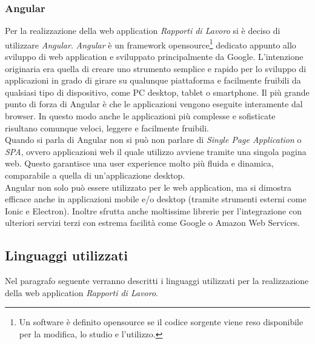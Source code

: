   \subsubsection{Angular}
  Per la realizzazione della web application \textit{Rapporti di Lavoro} si è deciso di utilizzare 
  \textit{Angular}. \textit{Angular} è un framework opensource\footnote{Un software è definito opensource 
  se il codice sorgente viene reso disponibile per la modifica, lo studio e l'utilizzo.} dedicato appunto allo 
  sviluppo di web application e sviluppato principalmente da Google. L'intenzione originaria era quella di creare uno 
  strumento semplice e rapido per lo sviluppo di applicazioni in grado di girare su qualunque piattaforma e facilmente fruibili da 
  qualsiasi tipo di dispositivo, come PC desktop, tablet o smartphone. Il più grande punto di forza di Angular è che 
  le applicazioni vengono eseguite interamente dal browser. In questo modo anche le applicazioni più complesse e sofisticate 
  risultano comunque veloci, leggere e facilmente fruibili.\\
  Quando si parla di Angular non si può non parlare di \textit{Single Page Application} o \textit{SPA}, ovvero applicazioni web il quale utilizzo avviene 
  tramite una singola pagina web. Questo garantisce una user experience molto più fluida e dinamica, comparabile a quella di un'applicazione 
  desktop.\\
  Angular non solo può essere utilizzato per le web application, ma si dimostra efficace anche  
  in applicazioni mobile e/o desktop (tramite strumenti esterni come Ionic e Electron). Inoltre sfrutta 
  anche moltissime librerie per l'integrazione con ulteriori servizi terzi con estrema facilità
  come Google o Amazon Web Services.

  \subsection{Linguaggi utilizzati}
  Nel paragrafo seguente verranno descritti i linguaggi utilizzati per la realizzazione della web application \textit{Rapporti di Lavoro}.
